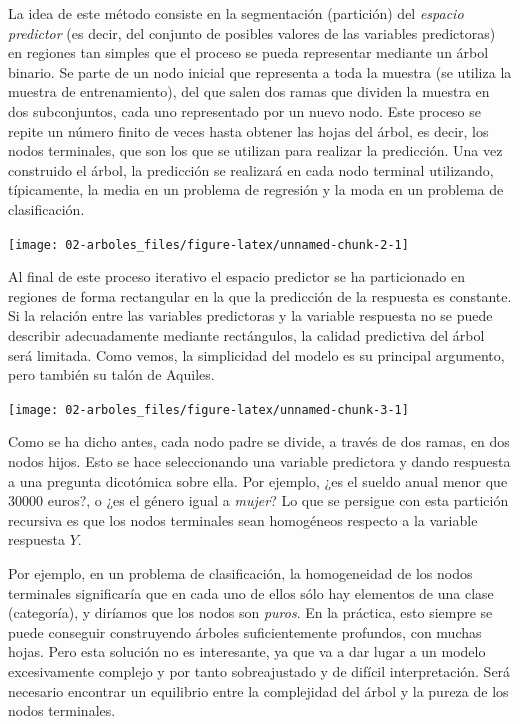 \documentclass[
  spanish,
]{book}
\theoremstyle{break}
\theoremstyle{definition}
\theoremstyle{definition}
\theoremstyle{definition}
\theoremstyle{remark}
\begin{document}
La idea de este método consiste en la segmentación (partición) del \emph{espacio predictor} (es decir, del conjunto de posibles valores de las variables predictoras) en regiones tan simples que el proceso se pueda representar mediante un árbol binario.
Se parte de un nodo inicial que representa a toda la muestra (se utiliza la muestra de entrenamiento), del que salen dos ramas que dividen la muestra en dos subconjuntos, cada uno representado por un nuevo nodo.
Este proceso se repite un número finito de veces hasta obtener las hojas del árbol, es decir, los nodos terminales, que son los que se utilizan para realizar la predicción.
Una vez construido el árbol, la predicción se realizará en cada nodo terminal utilizando, típicamente, la media en un problema de regresión y la moda en un problema de clasificación.

\begin{center}\texttt{[image: 02-arboles\_files/figure-latex/unnamed-chunk-2-1]} \end{center}

Al final de este proceso iterativo el espacio predictor se ha particionado en regiones de forma rectangular en la que la predicción de la respuesta es constante.
Si la relación entre las variables predictoras y la variable respuesta no se puede describir adecuadamente mediante rectángulos, la calidad predictiva del árbol será limitada.
Como vemos, la simplicidad del modelo es su principal argumento, pero también su talón de Aquiles.

\begin{center}\texttt{[image: 02-arboles\_files/figure-latex/unnamed-chunk-3-1]} \end{center}

Como se ha dicho antes, cada nodo padre se divide, a través de dos ramas, en dos nodos hijos.
Esto se hace seleccionando una variable predictora y dando respuesta a una pregunta dicotómica sobre ella.
Por ejemplo, ¿es el sueldo anual menor que 30000 euros?, o ¿es el género igual a \emph{mujer}?
Lo que se persigue con esta partición recursiva es que los nodos terminales sean homogéneos respecto a la variable respuesta \(Y\).

Por ejemplo, en un problema de clasificación, la homogeneidad de los nodos terminales significaría que en cada uno de ellos sólo hay elementos de una clase (categoría), y diríamos que los nodos son \emph{puros}.
En la práctica, esto siempre se puede conseguir construyendo árboles suficientemente profundos, con muchas hojas.
Pero esta solución no es interesante, ya que va a dar lugar a un modelo excesivamente complejo y por tanto sobreajustado y de difícil interpretación.
Será necesario encontrar un equilibrio entre la complejidad del árbol y la pureza de los nodos terminales.
\end{document}
